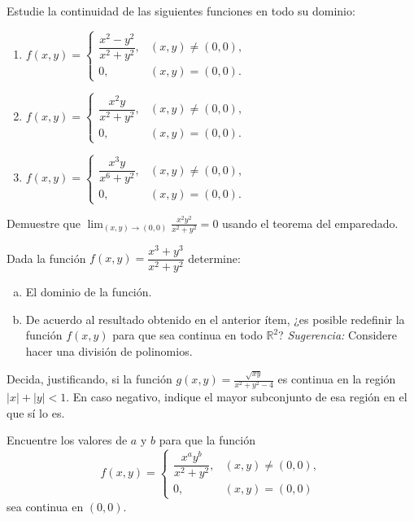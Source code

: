 \begin{prob}
Estudie la continuidad de las siguientes funciones en todo su dominio:
\begin{enumerate}
    \item $f(x,y)=\begin{cases}
    \dfrac{x^2-y^2}{x^2+y^2}, & (x,y)\neq(0,0),\\
    0, & (x,y)=(0,0).
    \end{cases}$
    \item $f(x,y)=\begin{cases}
    \dfrac{x^2 y}{x^2+y^2}, & (x,y)\neq(0,0),\\
    0, & (x,y)=(0,0).
    \end{cases}$
    \item $f(x,y)=\begin{cases}
    \dfrac{x^3 y}{x^6+y^2}, & (x,y)\neq(0,0),\\
    0, & (x,y)=(0,0).
    \end{cases}$
\end{enumerate}
\end{prob}

\begin{prob}
Demuestre que $\displaystyle\lim_{(x,y)\to(0,0)} \frac{x^2 y^2}{x^2+y^2}=0$
usando el teorema del emparedado.
\end{prob}

\begin{prob}
Dada la función $f(x,y)=\dfrac{x^3+y^3}{x^2+y^2}$ determine:
\begin{enumerate}[(a)]
\item El dominio de la función.
\item De acuerdo al resultado obtenido en el anterior ítem, ¿es posible redefinir la función $f(x,y)$ para que sea continua en todo $\mathbb{R}^2$?
\textit{Sugerencia:} Considere hacer una división de polinomios.
\end{enumerate}
\end{prob}

\begin{prob}
Decida, justificando, si la función $\displaystyle g(x,y)=
\frac{\sqrt{xy}}{x^2+y^2-4}$ es continua en la región $|x|+|y|<1$. En caso
negativo, indique el mayor subconjunto de esa región en el que sí lo es.
\end{prob}


\begin{prob}
Encuentre los valores de $a$ y $b$ para que la función
\[
f(x,y)=
\begin{cases}
\dfrac{x^a y^b}{x^2+y^2}, & (x,y)\neq(0,0),\\
0, & (x,y)=(0,0)
\end{cases}
\]
sea continua en $(0,0)$.
\end{prob}

